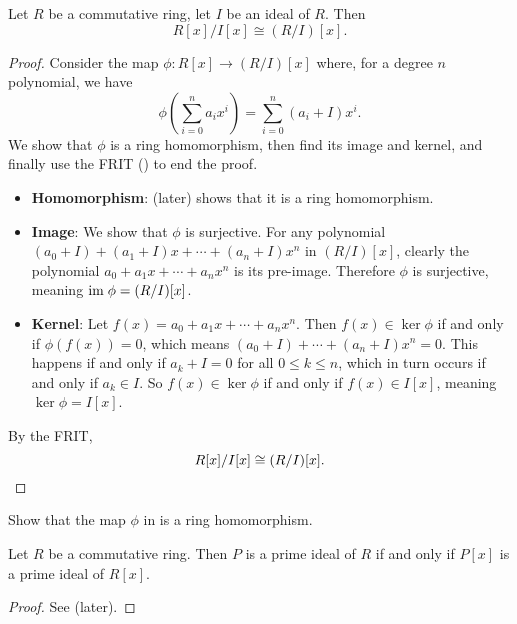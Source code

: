\begin{proposition}\label{prop-polynomial-ring-quotient-ideal-polynomial-ring-cong-quotient-polynomial-ring}
    Let $R$ be a commutative ring, let $I$ be an ideal of $R$. Then
    \[
        R[x]/I[x] \cong (R/I)[x].
    \]
\end{proposition}
\begin{proof}
    Consider the map $\phi: R[x] \to (R/I)[x]$ where, for a degree $n$ polynomial, we have
    \[
        \phi\left(\sum_{i=0}^na_ix^i\right) = \sum_{i=0}^n (a_i+I)x^i.
    \]
    We show that $\phi$ is a ring homomorphism, then find its image and kernel, and finally use the FRIT () to end the proof.
    \begin{itemize}
        \item \textbf{Homomorphism}:  (later) shows that it is a ring homomorphism.
        
        \item \textbf{Image}: We show that $\phi$ is surjective. For any polynomial $(a_0+I) + (a_1+I)x + \cdots + (a_n+I)x^n$ in $(R/I)[x]$, clearly the polynomial $a_0 + a_1x + \cdots + a_nx^n$ is its pre-image. Therefore $\phi$ is surjective, meaning $\mathrm{im}\; \phi = (R/I)[x]$.
        
        \item \textbf{Kernel}: Let $f(x) = a_0 + a_1x + \cdots + a_nx^n$. Then $f(x) \in \ker\phi$ if and only if $\phi(f(x)) = 0$, which means $(a_0+I) + \cdots + (a_n+I)x^n = 0$. This happens if and only if $a_k + I = 0$ for all $0 \leq k \leq n$, which in turn occurs if and only if $a_k \in I$. So $f(x) \in \ker\phi$ if and only if $f(x) \in I[x]$, meaning $\ker\phi = I[x]$.
    \end{itemize}
    By the FRIT,
    \[
        R[x]/I[x] \cong (R/I)[x].\qedhere
    \]
\end{proof}

\begin{exercise}\label{exercise-polynomial-ring-maps-to-quotient-polynomial-ring-is-homomorphism}
    Show that the map $\phi$ in  is a ring homomorphism.
\end{exercise}

\begin{theorem}\label{thrm-prime-ideal-iff-prime-ideal-in-polynomial-ring}
    Let $R$ be a commutative ring. Then $P$ is a prime ideal of $R$ if and only if $P[x]$ is a prime ideal of $R[x]$.
\end{theorem}
\begin{proof}
    See  (later).
\end{proof}

